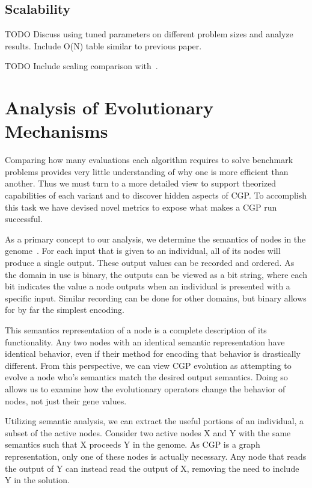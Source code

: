 \documentclass[journal]{IEEEtran}
\begin{document}
\subsection{Scalability}
TODO Discuss using tuned parameters on different problem sizes and analyze
results.  Include O(N) table similar to previous paper.

TODO Include scaling comparison with~\cite{walker:2008:cgpmodules}.

\section{Analysis of Evolutionary Mechanisms}
\label{sec:analysis}
Comparing how many evaluations each algorithm requires to solve benchmark
problems provides very little understanding of why one is more efficient than another.
Thus we must turn to a more detailed view
to support theorized capabilities of each variant and
to discover hidden aspects of CGP.
To accomplish this task we have devised novel metrics to expose what makes a
CGP run successful.

As a primary concept to our analysis, we determine the semantics of nodes
in the genome~\cite{mcphee:2008:treesemantics}.
For each input that is given to an individual, all of its nodes
will produce a single output.  These output values can be recorded and ordered.
As the domain in use is binary, the outputs can be viewed as a bit string, where
each bit indicates the value a node outputs when an individual is presented with a
specific input.  Similar recording can be done for other domains, but binary
allows for by far the simplest encoding.

This semantics representation of a node is a complete description of its functionality.
Any two nodes with an identical semantic representation have identical behavior,
even if their method for encoding that behavior is drastically different.  From
this perspective, we can view CGP evolution as attempting to evolve a node who's
semantics match the desired output semantics.  Doing so allows
us to examine how the evolutionary operators change the behavior of nodes,
not just their gene values.

Utilizing semantic analysis, we can extract the useful
portions of an individual, a subset of the active nodes.  Consider two active
nodes X and Y with the same semantics such that X proceeds Y in the genome.
As CGP is a graph representation, only
one of these nodes is actually necessary.  Any node that reads the output of Y
can instead read the output of X, removing the need to include Y in the solution.
\end{document}
